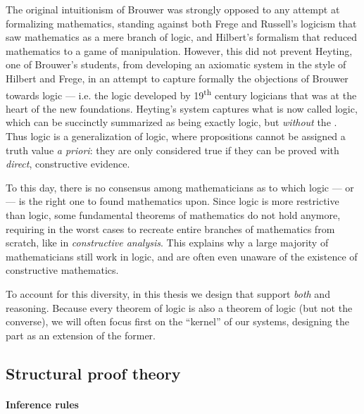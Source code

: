 \AP
The original intuitionism of Brouwer was strongly opposed to any attempt at
formalizing mathematics, standing against both Frege and Russell's logicism that
saw mathematics as a mere branch of logic, and Hilbert's formalism that reduced
mathematics to a game of  manipulation. However, this did not prevent
Heyting, one of Brouwer's students, from developing an axiomatic system in the
style of Hilbert and Frege, in an attempt to capture formally the objections of
Brouwer towards  logic --- i.e. the logic developed by
19\textsuperscript{th} century logicians that was at the heart of the new
 foundations. Heyting's system captures what is now called
 logic, which can be succinctly summarized as being
exactly  logic, but \emph{without} the . Thus  logic is a generalization of 
logic, where propositions cannot be assigned a truth value \emph{a priori}: they
are only considered true if they can be proved with \emph{direct}, constructive
evidence.

To this day, there is no consensus among mathematicians as to which logic ---
 or  --- is the right one to found mathematics upon.
Since  logic is more restrictive than  logic, some
fundamental theorems of  mathematics do not hold anymore, requiring in
the worst cases to recreate entire branches of mathematics from scratch, like in
\emph{constructive analysis}. This explains why a large majority of
mathematicians still work in  logic, and are often even unaware of the
existence of constructive mathematics.

\begin{emphpar}
To account for this diversity, in this thesis we design  that
support \emph{both}  and  reasoning. Because every
theorem of  logic is also a theorem of  logic (but not
the converse), we will often focus first on the  ``kernel'' of our
systems, designing the  part as an extension of the former.
\end{emphpar}

\subsection{Structural proof theory}

\paragraph{Inference rules}

